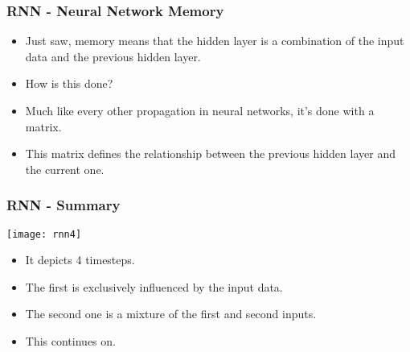\begin{frame}[fragile] \frametitle{RNN - Neural Network Memory}
\begin{itemize}
\item Just saw, memory means that the hidden layer is a combination of the input data and the previous hidden layer. 
\item How is this done?
\item Much like every other propagation in neural networks, it's done with a matrix. 
\item This matrix defines the relationship between the previous hidden layer and the current one.
\end{itemize}
\end{frame}


\begin{frame}[fragile] \frametitle{RNN - Summary}
\begin{center}
\texttt{[image: rnn4]}
\end{center}
\begin{itemize}
\item It depicts 4 timesteps. 
\item The first is exclusively influenced by the input data. 
\item The second one is a mixture of the first and second inputs. 
\item This continues on. 
\end{itemize}
\end{frame}

